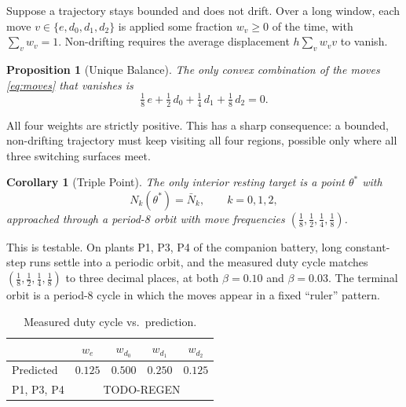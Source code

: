 \documentclass[twocolumn]{ifacconf}
\newtheorem{proposition}{Proposition}
\newtheorem{corollary}{Corollary}
\newcommand{\Nbar}{\bar{N}}
\begin{document}
Suppose a trajectory stays bounded and does not drift. Over a long window, each
move $v \in \{e, d_0, d_1, d_2\}$ is applied some fraction $w_v \ge 0$ of the
time, with $\sum_v w_v = 1$. Non-drifting requires the average displacement
$h \sum_v w_v v$ to vanish.

\begin{proposition}[Unique Balance]
\label{prop:balance}
The only convex combination of the moves \eqref{eq:moves} that vanishes is
\begin{equation}
\tfrac{1}{8}\, e + \tfrac{1}{2}\, d_0 + \tfrac{1}{4}\, d_1
+ \tfrac{1}{8}\, d_2 = 0.
\label{eq:weights}
\end{equation}
\end{proposition}

All four weights are strictly positive. This has a sharp consequence: a bounded,
non-drifting trajectory must keep visiting all four regions, possible only
where all three switching surfaces meet.

\begin{corollary}[Triple Point]
\label{cor:triple}
The only interior resting target is a point $\theta^*$ with
\begin{equation}
N_k(\theta^*) = \Nbar_k, \qquad k = 0, 1, 2,
\label{eq:triplepoint}
\end{equation}
approached through a period-8 orbit with move frequencies
$(\tfrac18, \tfrac12, \tfrac14, \tfrac18)$.
\end{corollary}

This is testable. On plants P1, P3, P4 of the companion battery, long
constant-step runs settle into a periodic orbit, and the measured duty cycle
matches $(\tfrac18, \tfrac12, \tfrac14, \tfrac18)$ to three decimal places, at
both $\beta = 0.10$ and $\beta = 0.03$. The terminal orbit is a period-8 cycle
in which the moves appear in a fixed ``ruler'' pattern.

\begin{table}[t]
\small
\centering
\caption{Measured duty cycle vs.\ prediction.
}
\label{tab:duty}
\begin{tabular}{lcccc}
\toprule
 & $w_e$ & $w_{d_0}$ & $w_{d_1}$ & $w_{d_2}$ \\
\midrule
Predicted & $0.125$ & $0.500$ & $0.250$ & $0.125$ \\
P1, P3, P4 & \multicolumn{4}{c}{TODO-REGEN} \\
\bottomrule
\end{tabular}
\end{table}
\end{document}
